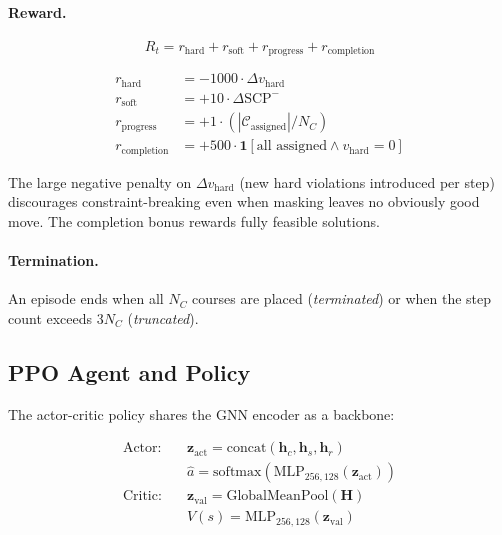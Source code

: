 \documentclass[conference]{IEEEtran}
\begin{document}
\paragraph{Reward.}

\begin{equation}
R_t = r_\text{hard} + r_\text{soft} + r_\text{progress} + r_\text{completion}
\label{eq:reward}
\end{equation}

\begin{align*}
r_\text{hard}       &= -1000 \cdot \Delta v_\text{hard} \\
r_\text{soft}       &= +10   \cdot \Delta \text{SCP}^- \\
r_\text{progress}   &= +1    \cdot (|\mathcal{C}_\text{assigned}| / N_C) \\
r_\text{completion} &= +500  \cdot \mathbf{1}[\text{all assigned} \wedge v_\text{hard}=0]
\end{align*}

The large negative penalty on $\Delta v_\text{hard}$ (new hard violations introduced per step) discourages constraint-breaking even when masking leaves no obviously good move. The completion bonus rewards fully feasible solutions.

\paragraph{Termination.} An episode ends when all $N_C$ courses are placed (\textit{terminated}) or when the step count exceeds $3 N_C$ (\textit{truncated}).

\subsection{PPO Agent and Policy}

The actor-critic policy shares the GNN encoder as a backbone:

\begin{align}
\text{Actor:}  \quad &\mathbf{z}_\text{act} = \mathrm{concat}(\mathbf{h}_c, \mathbf{h}_s, \mathbf{h}_r) \\
                     &\hat{a} = \mathrm{softmax}(\mathrm{MLP}_{256,128}(\mathbf{z}_\text{act})) \\
\text{Critic:} \quad &\mathbf{z}_\text{val} = \mathrm{GlobalMeanPool}(\mathbf{H}) \\
                     &V(s) = \mathrm{MLP}_{256,128}(\mathbf{z}_\text{val})
\end{align}
\end{document}
